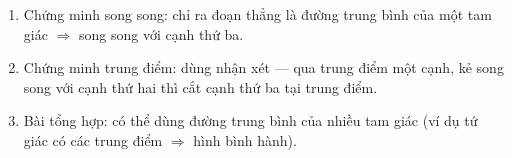 \begin{enumerate}
\item Chứng minh song song: chỉ ra đoạn thẳng là đường trung bình của một tam giác $\Rightarrow$ song song với cạnh thứ ba.
\item Chứng minh trung điểm: dùng nhận xét — qua trung điểm một cạnh, kẻ song song với cạnh thứ hai thì cắt cạnh thứ ba tại trung điểm.
\item Bài tổng hợp: có thể dùng đường trung bình của nhiều tam giác (ví dụ tứ giác có các trung điểm $\Rightarrow$ hình bình hành).
\end{enumerate}
